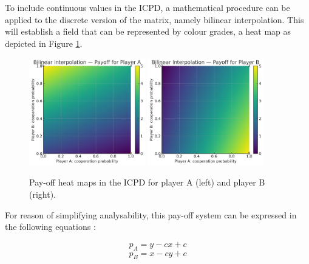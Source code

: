 \documentclass[11pt]{article}
\begin{document}
To include continuous values in the ICPD, a mathematical procedure can be applied to the discrete version of the matrix, namely bilinear interpolation.
This will establish a field that can be represented by colour grades, a heat map as depicted in Figure \ref{fig:heatmaps}.

\begin{figure}[h]
	\centering
	\includegraphics[width=0.45\textwidth]{images/pd_heatmap_A}\hfill
	\includegraphics[width=0.45\textwidth]{images/pd_heatmap_B}
	\caption{Pay-off heat maps in the ICPD for player A (left) and player B (right).}
	\label{fig:heatmaps}
\end{figure}

%
%
For reason of simplifying analysability, this pay-off system can be expressed in the following equations \cite[cf.][p.~259]{LB07}:

\begin{equation}
	p_A = y - c x + c
	\label{eq:payoff_A}
\end{equation}
\begin{equation}
	p_B = x - c y + c
	\label{eq:payoff_B}
\end{equation}
\end{document}

